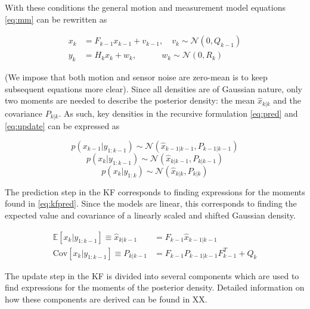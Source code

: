 With these conditions the general motion and measurement model equations \eqref{eq:mm} can be rewritten as

\begin{equation}
    \begin{split}
     x_k &= F_{k-1}x_{k-1} + v_{k-1}, \quad v_k \sim \mathcal{N}(0,Q_{k-1}) \\
     y_k &= H_kx_k + w_ k, \quad\quad\enspace\enspace w_k \sim \mathcal{N}(0,R_{k})
    \end{split}\label{eq:motion_meas}
\end{equation}

(We impose that both motion and sensor noise are zero-mean is to keep subsequent equations more clear). Since all densities are of Gaussian nature, only two moments are needed to describe the posterior density: the mean $\hat{x}_{k|k}$ and the covariance $P_{k|k}$. As such, key densities in the recursive formulation \eqref{eq:pred} and \eqref{eq:update} can be expressed as

\begin{equation}
        p(x_{k-1}|y_{1:k-1}) \sim \mathcal{N}(\hat{x}_{k-1|k-1}, P_{k-1|k-1})
\end{equation}
\begin{equation}
        p(x_{k}|y_{1:k-1})   \sim \mathcal{N}(\hat{x}_{k|k-1}, P_{k|k-1})
        \label{eq:kfpred}
\end{equation}
\begin{equation}
        p(x_{k}|y_{1:k})     \sim \mathcal{N}(\hat{x}_{k|k}, P_{k|k}) 
        \label{eq:kfupdate}
\end{equation}

The prediction step in the KF corresponds to finding expressions for the moments found in \eqref{eq:kfpred}. Since the models are linear, this corresponds to finding the expected value and covariance of a linearly scaled and shifted Gaussian density.

\begin{equation}
    \begin{split}
        \mathbb{E}[x_k|y_{1:k-1}] \equiv \hat{x}_{k|k-1} &= F_{k-1}\hat{x}_{k-1|k-1} \\
        \text{Cov}[x_k|y_{1:k-1}] \equiv P_{k|k-1} &= F_{k-1}P_{k-1|k-1}F_{k-1}^{T} + Q_k 
    \end{split}
\end{equation}

The update step in the KF is divided into several components which are used to find expressions for the moments of the posterior density. Detailed information on how these components are derived can be found in XX. 

